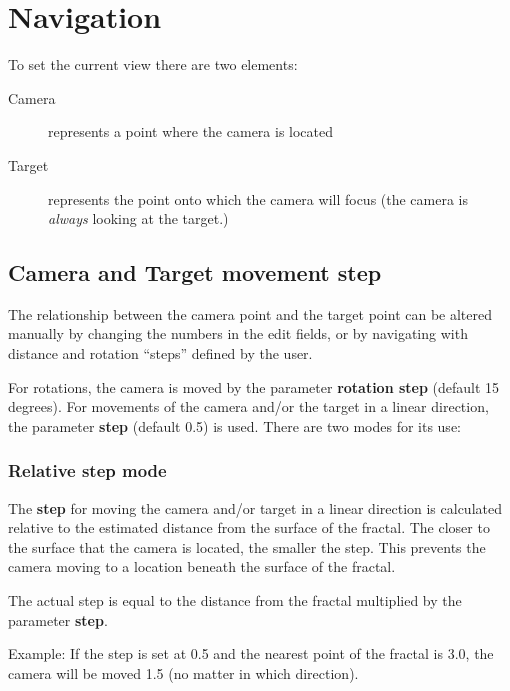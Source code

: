 \section{Navigation}\label{navigation}

To set the current view there are two elements:

\begin{description}
	\item[Camera] represents a point where the camera is located
	\item[Target] represents the point onto which the camera will focus (the
	camera is \emph{always} looking at the target.)
\end{description}

\subsection{Camera and Target movement
	step}\label{camera-and-target-movement-step}

The relationship between the camera point and the target point can be altered
manually by changing the numbers in the edit fields, or by navigating with
distance and rotation ``steps'' defined by the user.

For rotations, the camera is moved by the parameter \textbf{rotation step}
(default 15 degrees). For movements of the camera and/or the target in a linear
direction, the parameter \textbf{step} (default 0.5) is used. There are two
modes for its use:

\subsubsection{Relative step mode}\label{relative-step-mode}

The \textbf{step} for moving the camera and/or target in a linear direction is
calculated relative to the estimated distance from the surface of the fractal.
The closer to the surface that the camera is located, the smaller the step. This
prevents the camera moving to a location beneath the surface of the fractal.

The actual step is equal to the distance from the fractal multiplied by the
parameter \textbf{step}.

Example: If the step is set at 0.5 and the nearest point of the
fractal is 3.0, the camera will be moved 1.5 (no matter in which direction).

